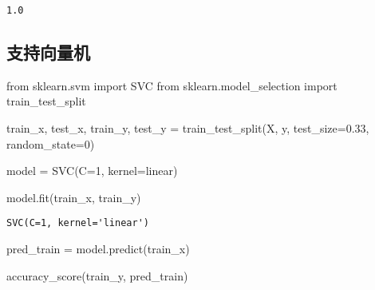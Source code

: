\documentclass[
  letterpaper,
  DIV=11,
  numbers=noendperiod]{scrreprt}
\newenvironment{Shaded}{\begin{snugshade}}{\end{snugshade}}
\newcommand{\DecValTok}[1]{\textcolor[rgb]{0.68,0.00,0.00}{#1}}
\newcommand{\FloatTok}[1]{\textcolor[rgb]{0.68,0.00,0.00}{#1}}
\newcommand{\ImportTok}[1]{\textcolor[rgb]{0.00,0.46,0.62}{#1}}
\newcommand{\NormalTok}[1]{\textcolor[rgb]{0.00,0.23,0.31}{#1}}
\newcommand{\OperatorTok}[1]{\textcolor[rgb]{0.37,0.37,0.37}{#1}}
\newcommand{\StringTok}[1]{\textcolor[rgb]{0.13,0.47,0.30}{#1}}
\begin{document}
\begin{verbatim}
1.0
\end{verbatim}

\hypertarget{ux652fux6301ux5411ux91cfux673a}{%
\subsection{支持向量机}\label{ux652fux6301ux5411ux91cfux673a}}

\begin{Shaded}
\begin{Highlighting}[]
\ImportTok{from}\NormalTok{ sklearn.svm }\ImportTok{import}\NormalTok{ SVC }
\ImportTok{from}\NormalTok{ sklearn.model\_selection }\ImportTok{import}\NormalTok{ train\_test\_split}
\end{Highlighting}
\end{Shaded}

\begin{Shaded}
\begin{Highlighting}[]
\NormalTok{train\_x, test\_x, train\_y, test\_y }\OperatorTok{=}\NormalTok{ train\_test\_split(X, y, test\_size}\OperatorTok{=}\FloatTok{0.33}\NormalTok{, random\_state}\OperatorTok{=}\DecValTok{0}\NormalTok{) }

\NormalTok{model }\OperatorTok{=}\NormalTok{ SVC(C}\OperatorTok{=}\DecValTok{1}\NormalTok{, kernel}\OperatorTok{=}\StringTok{\textquotesingle{}linear\textquotesingle{}}\NormalTok{) }
\end{Highlighting}
\end{Shaded}

\begin{Shaded}
\begin{Highlighting}[]
\NormalTok{model.fit(train\_x, train\_y)}
\end{Highlighting}
\end{Shaded}

\begin{verbatim}
SVC(C=1, kernel='linear')
\end{verbatim}

\begin{Shaded}
\begin{Highlighting}[]
\NormalTok{pred\_train }\OperatorTok{=}\NormalTok{ model.predict(train\_x) }
\end{Highlighting}
\end{Shaded}

\begin{Shaded}
\begin{Highlighting}[]
\NormalTok{accuracy\_score(train\_y, pred\_train)}
\end{Highlighting}
\end{Shaded}
\end{document}
